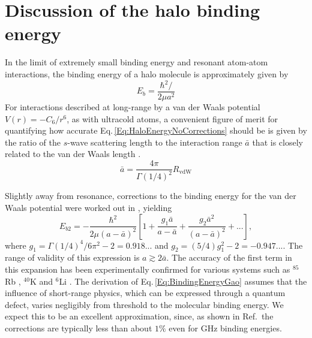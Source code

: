 \section{Discussion of the halo binding energy} \label{sec:lowE_alt}
In the limit of extremely small binding energy and resonant atom-atom interactions, the binding energy of a halo molecule is approximately given by \hl{\cite{Kohler2006, hle57,Chin2010}}
\begin{equation} \label{Eq:HaloEnergyNoCorrections}
	E_b=\frac{\hbar^2/}{2\mu a^2}
\end{equation}
For interactions described at long-range by a van der Waals potential $V(r)=-C_6/r^6$, as with ultracold atoms, a convenient figure of merit for quantifying how accurate Eq.\,\ref{Eq:HaloEnergyNoCorrections} should be is given by the ratio of the $s$-wave scattering length to the interaction range $\bar{a}$ that is closely related to the van der Waals length \hl{\cite{gfl93,cju05}}.
\begin{equation} \label{Eq:InteractionRangevdW}
  \bar{a} = \frac{4 \pi}{\Gamma(1/4)^2}R_\mathrm{vdW}
\end{equation}

Slightly away from resonance, corrections to the binding energy for the van der Waals potential were worked out in \hl{\cite{Gao01,gao04}}, yielding
\begin{equation} \label{Eq:BindingEnergyGao}
	E_{b2}=-\frac{\hbar^2}{2\mu(a-\bar{a})^2}\left[1+\frac{g_1\bar{a}}{a-\bar{a}}+\frac{g_2\bar{a}^2}{(a-\bar{a})^2} + ... \right],
\end{equation}
where $g_1=\Gamma(1/4)^4/6\pi^2-2=0.918...$ and $g_2=(5/4)g_1^2-2=-0.947...$. 
The range of validity of this expression is $a \gtrsim 2 \bar{a}$.
The accuracy of the first term in this expansion has been experimentally confirmed for various systems such as $^{85}$Rb \hl{\cite{ckt03,kgb03}}, $^{40}$K \hl{\cite{rtb03,msg05}} and $^{6}$Li \hl{\cite{bar05}}.
The derivation of Eq.\,\ref{Eq:BindingEnergyGao} assumes that the influence of short-range physics, which can be expressed through a quantum defect, varies negligibly from threshold to the molecular binding energy.
We expect this to be an excellent approximation, since, as shown in Ref.\,\hl{\cite{Gao01}} the corrections are typically less than about $1\%$ even for GHz binding energies.

